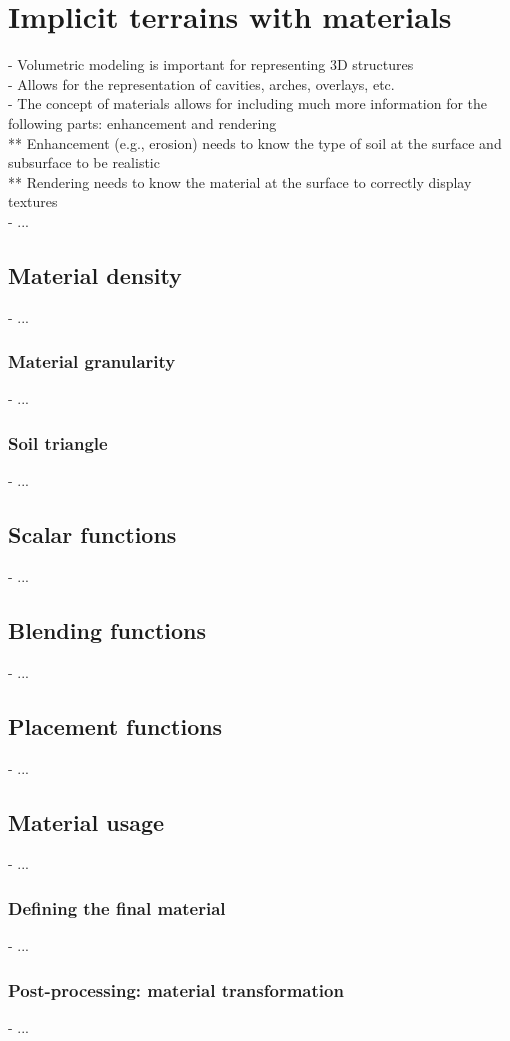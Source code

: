 \section{Implicit terrains with materials}
\label{sec:state-of-the-art_implicit-terrain-with-materials}
- Volumetric modeling is important for representing 3D structures \\
- Allows for the representation of cavities, arches, overlays, etc. \\
- The concept of materials allows for including much more information for the following parts: enhancement and rendering \\
** Enhancement (e.g., erosion) needs to know the type of soil at the surface and subsurface to be realistic \\
** Rendering needs to know the material at the surface to correctly display textures \\
- ...

\subsection{Material density}
- ...

\subsubsection{Material granularity}
- ...

\subsubsection{Soil triangle}
- ...

\subsection{Scalar functions}
- ...

\subsection{Blending functions}
- ...

\subsection{Placement functions}
- ...

\subsection{Material usage}
- ...

\subsubsection{Defining the final material}
- ...

\subsubsection{Post-processing: material transformation}
- ...
